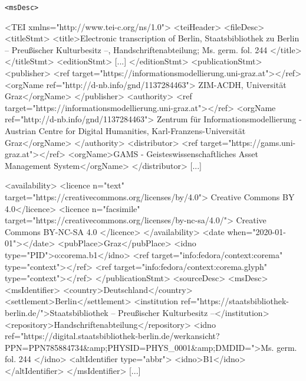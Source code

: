 \begin{frame}{\texttt{<msDesc>}}

\begin{xmlcode}
<TEI xmlns="http://www.tei-c.org/ns/1.0">
  <teiHeader>
    <fileDesc>
      <titleStmt>
        <title>Electronic transcription of Berlin, Staatsbibliothek 
        zu Berlin – Preußischer Kulturbesitz –, 
        Handschriftenabteilung; Ms. germ. fol. 244 </title>
      </titleStmt>
      <editionStmt> [...] </editionStmt>
      <publicationStmt>
        <publisher>
          <ref target="https://informationsmodellierung.uni-graz.at"></ref>
          <orgName ref="http://d-nb.info/gnd/1137284463">
          ZIM-ACDH, Universität Graz</orgName>
        </publisher>
        <authority>
          <ref target="https://informationsmodellierung.uni-graz.at"></ref>
          <orgName ref="http://d-nb.info/gnd/1137284463">
          Zentrum für Informationsmodellierung - Austrian Centre 
          for Digital Humanities, Karl-Franzens-Universität Graz</orgName>
        </authority>
        <distributor>
          <ref target="https://gams.uni-graz.at"></ref>
          <orgName>GAMS - Geisteswissenschaftliches 
          Asset Management System</orgName>
        </distributor>
        [...]
\end{xmlcode}


\framebreak 


\begin{xmlcode}
[...]
        <availability>
          <licence n="text" target="https://creativecommons.org/licenses/by/4.0">
          Creative Commons BY 4.0</licence>
          <licence n="facsimile" target="https://creativecommons.org/licenses/by-nc-sa/4.0/">
          Creative Commons BY-NC-SA 4.0 </licence>
        </availability>
        <date when="2020-01-01"></date>
        <pubPlace>Graz</pubPlace>
        <idno type="PID">o:corema.b1</idno>
        <ref target="info:fedora/context:corema" type="context"></ref>
        <ref target="info:fedora/context:corema.glyph" type="context"></ref>
      </publicationStmt>
      <sourceDesc>
        <msDesc>
          <msIdentifier>
            <country>Deutschland</country>
            <settlement>Berlin</settlement>
            <institution ref="https://staatsbibliothek-berlin.de/">Staatsbibliothek – Preußischer Kulturbesitz –</institution>
            <repository>Handschriftenabteilung</repository>
            <idno ref="https://digital.staatsbibliothek-berlin.de/werkansicht?PPN=PPN785884734&amp;PHYSID=PHYS_0001&amp;DMDID=">Ms. germ. fol. 244 </idno>
            <altIdentifier type="abbr">
              <idno>B1</idno>
            </altIdentifier>
          </msIdentifier>
          [...]
\end{xmlcode}



\end{frame}
